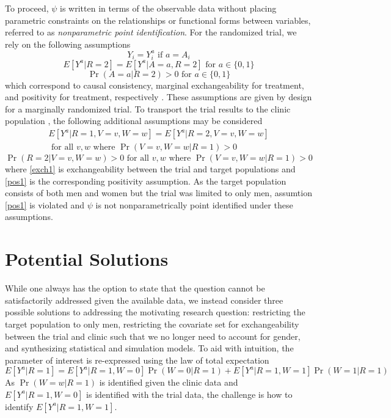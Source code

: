 \documentclass[]{article}
\begin{document}
To proceed, $\psi$ is written in terms of the observable data without placing parametric constraints on the relationships or functional forms between variables, referred to as \textit{nonparametric point identification}. For the randomized trial, we rely on the following assumptions
\[Y_i = Y_i^a \text{ if } a=A_i\]
\[E[Y^a | R=2] = E[Y^a | A=a, R=2] \text{ for } a \in\{0, 1\}\]
\[\Pr(A=a | R=2) > 0 \text{ for } a\in\{0, 1\}\]
which correspond to causal consistency, marginal exchangeability for treatment, and positivity for treatment, respectively \cite{zivich_positivity_2022, hernan_estimating_2006, cole_consistency_2009}. These assumptions are given by design for a marginally randomized trial. To transport the trial results to the clinic population \cite{westreich_transportability_2017}, the following additional assumptions may be considered
\begin{equation}
	\begin{aligned}
		E[Y^a | R=1,V=v,W=w] = E[Y^a | R=2,V=v,W=w] \\
		\text{ for all } v,w \text{ where } \Pr(V=v,W=w | R=1) > 0
	\end{aligned}
	\label{exch1}
\end{equation}
\begin{equation}
	\Pr(R=2 | V=v, W=w) > 0 \text{ for all } v,w \text{ where } \Pr(V=v,W=w | R=1) > 0
	\label{pos1}
\end{equation}
where \ref{exch1} is exchangeability between the trial and target populations and \ref{pos1} is the corresponding positivity assumption. As the target population consists of both men and women but the trial was limited to only men, assumtion \ref{pos1} is violated and $\psi$ is not nonparametrically point identified under these assumptions.

\section*{Potential Solutions}

While one always has the option to state that the question cannot be satisfactorily addressed given the available data, we instead consider three possible solutions to addressing the motivating research question: restricting the target population to only men, restricting the covariate set for exchangeability between the trial and clinic such that we no longer need to account for gender, and synthesizing statistical and simulation models. To aid with intuition, the parameter of interest is re-expressed using the law of total expectation
\begin{equation}
	E[Y^a | R=1] = E[Y^a | R=1,W=0]\Pr(W=0 | R=1) +  E[Y^a | R=1,W=1]\Pr(W=1 | R=1)
	\label{parameter}
\end{equation}
As $\Pr(W=w | R=1)$ is identified given the clinic data and $E[Y^a | R=1, W=0]$ is identified with the trial data, the challenge is how to identify $E[Y^a | R=1, W=1]$.
\end{document}
